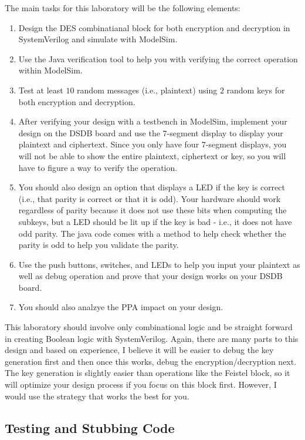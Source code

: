 \documentclass{article}
\begin{document}
The main tasks for this laboratory
will be the following elements:
\begin{enumerate}
  \item Design the DES combinatianal block for both encryption and
    decryption in SystemVerilog and simulate with ModelSim.
  \item Use the Java verification tool to help you with verifying the
    correct operation within ModelSim.
  \item Test at least $10$ random messages (i.e., plaintext) using
    $2$ random keys for both encryption and decryption.
  \item After verifying your design with a testbench in ModelSim,
    implement your design on the DSDB board and use the    
    $7$-segment display to display your plaintext and ciphertext.
    Since you only have four $7$-segment displays, you will not be
    able to show the entire plaintext, ciphertext or key, so you will
    have to figure a way to verify the operation.
  \item You should also design an option that displays a LED if the
      key is correct (i.e., that parity is correct or that it is
      odd).  Your hardware should work regardless of parity because it
      does not use these bits when computing the subkeys, but a LED
      should be lit up if the key is bad - i.e., it does not have odd
      parity.  The java code comes with a method to help check whether
      the parity is odd to help you validate the parity.
  \item Use the push buttons, switches, and LEDs to help you input
    your plaintext as well as debug operation and prove that your
    design works on your DSDB board.
    \item You should also analzye the PPA impact on your design. 
\end{enumerate}
This laboratory should involve only combinational logic and be
straight forward in creating Boolean logic with SystemVerilog.
Again, there are many parts to this design and based on experience, I
believe it will be easier to debug the key generation first and then
once this works, debug the encryption/decryption next.  The key
generation is slightly easier than operations like the Feistel block,
so it will optimize your design process if you focus on this block
first.  However, I would use the strategy that works the best for you.

\subsection{Testing and Stubbing Code}
\end{document}
